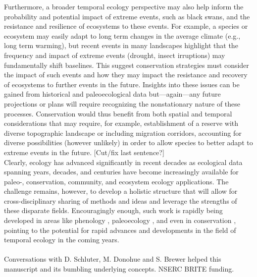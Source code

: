 \documentclass[11pt,a4paper,oneside]{article}
\begin{document}
Furthermore, a broader temporal ecology perspective may also help inform the probability and potential impact of extreme events, such as black swans, and the resistance and resilience of ecosystems to these events. For example, a species or ecosystem may easily adapt to long term changes in the average climate (e.g., long term warming), but recent events in many landscapes \citep{Anderegg2013} highlight that the frequency and impact of extreme events (drought, insect irruptions) may fundamentally shift baselines. This suggest conservation strategies must consider the impact of such events and how they may impact the resistance and recovery of ecosystems to further events in the future. Insights into these issues can be gained from historical and paleoecological data but---again---any future projections or plans will require recognizing the nonstationary nature of these processes. Conservation would thus benefit from both spatial and temporal considerations that may require, for example, establishment of a reserve with diverse topographic landscape or including migration corridors, accounting for diverse possibilities (however unlikely) in order to allow species to better adapt to extreme events in the future. [Cut/fix last sentence?]\\

Clearly, ecology has advanced significantly in recent decades as ecological data spanning years, decades, and centuries have become increasingly available for paleo-, conservation, community, and ecosystem ecology applications. The challenge remains, however, to develop a holistic structure that will allow for cross-disciplinary sharing of methods and ideas and leverage the strengths of these disparate fields. Encouragingly enough, such work is rapidly being developed in areas like phenology \citep{wgreview}, paleoecology \citep{Brewer2012}, and even in conservation \citep{mooers2008}, pointing to the potential for rapid advances and developments in the field of temporal ecology in the coming years.\\

\\
Conversations with D. Schluter, M. Donohue and S. Brewer helped this manuscript and its bumbling underlying concepts. NSERC BRITE funding. %
\end{document}
